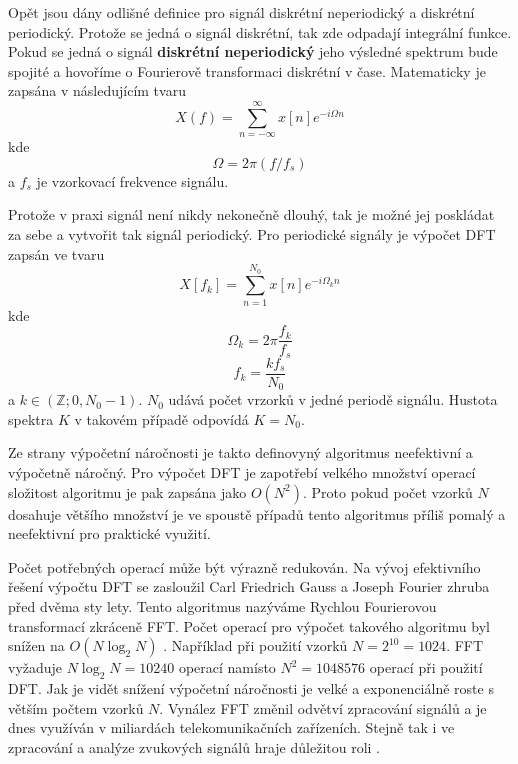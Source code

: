   Opět jsou dány odlišné definice pro signál diskrétní neperiodický a diskrétní periodický. Protože se jedná o signál diskrétní, tak zde odpadají integrální funkce.
  Pokud se jedná o signál \textbf{diskrétní neperiodický} jeho výsledné spektrum bude spojité a hovoříme o Fourierově transformaci diskrétní v čase. Matematicky je zapsána v následujícím tvaru
  \begin{equation}
    X(f) = \sum_{n = -\infty}^{\infty} x[n] e^{-i \Omega n}
    \label{rov:DTFT}
  \end{equation}
  kde
  \begin{equation}
    \Omega = 2 \pi (f/f_s)
  \end{equation}
  a $f_s$ je vzorkovací frekvence signálu.

  Protože v praxi signál není nikdy nekonečně dlouhý, tak je možné jej poskládat za sebe a vytvořit tak signál periodický. Pro periodické signály je výpočet \acs{DFT} zapsán ve tvaru
  \begin{equation}
    X[f_k] = \sum_{n = 1}^{N_0} x[n] e^{-i\Omega_k n}
    \label{rov:DFT}
  \end{equation}
  kde
  \begin{equation}
    \Omega_k = 2 \pi \frac{f_k}{f_s}
  \end{equation}
  \begin{equation}
    f_k = \frac{k f_s}{N_0}
  \end{equation}
  a $k \in(\mathbb{Z}; 0, N_0 -1)$. $N_0$ udává počet vrzorků v jedné periodě signálu.
  Hustota spektra $K$ v takovém případě odpovídá $K = N_0$.

  Ze strany výpočetní náročnosti je takto definovyný algoritmus neefektivní a výpočetně náročný.
  Pro výpočet \acs{DFT} je zapotřebí velkého množství operací složitost algoritmu je pak zapsána jako $O(N^2)$.
  Proto pokud počet vzorků $N$ dosahuje většího množství je ve spoustě případů tento algoritmus příliš pomalý a neefektivní pro praktické využití.

  Počet potřebných operací může být výrazně redukován. 
  Na vývoj efektivního řešení výpočtu \acs{DFT} se zasloužil Carl Friedrich Gauss a Joseph Fourier zhruba před dvěma sty lety. Tento algoritmus nazýváme Rychlou Fourierovou transformací zkráceně FFT.
  Počet operací pro výpočet takového algoritmu byl snížen na $O(N \log_2 N)$ \cite{fundamental_of_music_processing}.
  Například při použití vzorků $N = 2^{10} = 1024$. \acs{FFT} vyžaduje $N\log_2N = 10240 $ operací namísto $N^2 = 1048576$ operací při použití \acs{DFT}. Jak je vidět snížení výpočetní náročnosti je velké a exponenciálně roste s větším počtem vzorků $N$.
  Vynález \acs{FFT} změnil odvětví zpracování signálů a je dnes využíván v miliardách telekomunikačních zařízeních. Stejně tak i ve zpracování a analýze zvukových signálů hraje důležitou roli \cite{fundamental_of_music_processing}.


